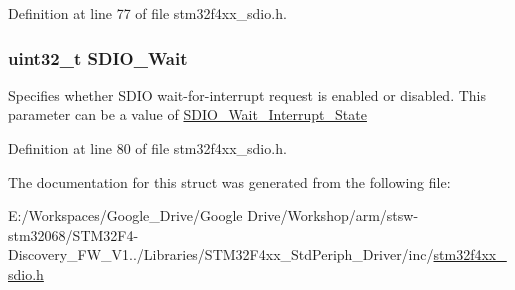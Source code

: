 Definition at line 77 of file stm32f4xx\-\_\-sdio.\-h.

\hypertarget{struct_s_d_i_o___cmd_init_type_def_afd47828b3053d2c3bf582fe8d092ab27}{
\subsubsection[{S\-D\-I\-O\-\_\-\-Wait}]{\setlength{\rightskip}{0pt plus 5cm}uint32\-\_\-t S\-D\-I\-O\-\_\-\-Wait}}\label{struct_s_d_i_o___cmd_init_type_def_afd47828b3053d2c3bf582fe8d092ab27}
Specifies whether S\-D\-I\-O wait-\/for-\/interrupt request is enabled or disabled. This parameter can be a value of \hyperlink{group___s_d_i_o___wait___interrupt___state}{S\-D\-I\-O\-\_\-\-Wait\-\_\-\-Interrupt\-\_\-\-State} 

Definition at line 80 of file stm32f4xx\-\_\-sdio.\-h.



The documentation for this struct was generated from the following file\-:\begin{DoxyCompactItemize}
\item 
E\-:/\-Workspaces/\-Google\-\_\-\-Drive/\-Google Drive/\-Workshop/arm/stsw-\/stm32068/\-S\-T\-M32\-F4-\/\-Discovery\-\_\-\-F\-W\-\_\-\-V1../\-Libraries/\-S\-T\-M32\-F4xx\-\_\-\-Std\-Periph\-\_\-\-Driver/inc/\hyperlink{stm32f4xx__sdio_8h}{stm32f4xx\-\_\-sdio.\-h}\end{DoxyCompactItemize}
